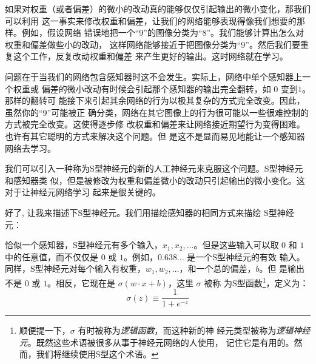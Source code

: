 如果对权重（或者偏差）的微小的改动真的能够仅仅引起输出的微小变化，那我们可以利用
这一事实来修改权重和偏差，让我们的网络能够表现得像我们想要的那样。例如，假设网络
错误地把一个``9''的图像分类为``8''。我们能够计算出怎么对权重和偏差做些小的改动，
这样网络能够接近于把图像分类为``9''。然后我们要重复这个工作，反复改动权重和偏差
来产生更好的输出。这时网络就在学习。

问题在于当我们的网络包含感知器时这不会发生。实际上，网络中单个感知器上一个权重或
偏差的微小改动有时候会引起那个感知器的输出完全翻转，如 $0$ 变到$1$。那样的翻转可
能接下来引起其余网络的行为以极其复杂的方式完全改变。因此，虽然你的``9''可能被正
确分类，网络在其它图像上的行为很可能以一些很难控制的方式被完全改变。这使得逐步修
改权重和偏差来让网络接近期望行为变得困难。也许有其它聪明的方式来解决这个问题。但
是这不是显而易见地能让一个感知器网络去学习。

我们可以引入一种称为S型神经元的新的人工神经元来克服这个问题。S型神经元和感知器类
似，但是被修改为权重和偏差微小的改动只引起输出的微小变化。这对于让神经元网络学习
起来是很关键的。

好了, 让我来描述下S型神经元。我们用描绘感知器的相同方式来描绘
S型神经元：
\begin{center}
\end{center}

恰似一个感知器，S型神经元有多个输入，$x_1,x_2,\ldots$。但是这些输入可以取 $0$ 和
$1$ 中的任意值，而不仅仅是 $0$ 或 $1$。例如，$0.638\ldots$ 是一个S型神经元的有效
输入。同样，S型神经元对每个输入有权重，$w_1,w_2,\ldots$，和一个总的偏差，$b$。但
是输出不是 $0$ 或 $1$。相反，它现在是 $\sigma(w \cdot x+b)$，这里 $\sigma$ 被称
为S型函数\footnote{顺便提一下，$\sigma$ 有时被称为\emph{逻辑函数}，而这种新的神
  经元类型被称为\emph{逻辑神经元}。既然这些术语被很多从事于神经元网络的人使用，
  记住它是有用的。然而，我们将继续使用S型这个术语。}，定义为：
\begin{equation}
  \sigma(z) \equiv \frac{1}{1+e^{-z}}
  \label{eq:3}\tag{3}
\end{equation}

